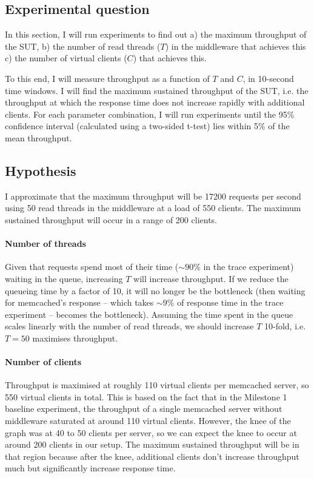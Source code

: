 \documentclass[11pt]{article}
\begin{document}
\subsection{Experimental question}

In this section, I will run experiments to find out a) the maximum throughput of the SUT, b) the number of read threads ($T$) in the middleware that achieves this c) the number of virtual clients ($C$) that achieves this.

To this end, I will measure throughput as a function of $T$ and $C$, in 10-second time windows. I will find the maximum sustained throughput of the SUT, i.e. the throughput at which the response time does not increase rapidly with additional clients. For each parameter combination, I will run experiments until the 95\% confidence interval (calculated using a two-sided t-test) lies within 5\% of the mean throughput.

\subsection{Hypothesis}

I approximate that the maximum throughput will be 17200 requests per second using 50 read threads in the middleware at a load of 550 clients. The maximum sustained throughput will occur in a range of 200 clients.

\paragraph{Number of threads} 
Given that requests spend most of their time ($\sim90\%$ in the trace experiment) waiting in the queue, increasing $T$ will increase throughput. If we reduce the queueing time by a factor of 10, it will no longer be the bottleneck (then waiting for memcached's response -- which takes $\sim9\%$ of response time in the trace experiment -- becomes the bottleneck). Assuming the time spent in the queue scales linearly with the number of read threads, we should increase $T$ 10-fold, i.e. $T=50$ maximises throughput.

\paragraph{Number of clients}
Throughput is maximised at roughly 110 virtual clients per memcached server, so 550 virtual clients in total. This is based on the fact that in the Milestone 1 baseline experiment, the throughput of a single memcached server without middleware saturated at around 110 virtual clients. However, the knee of the graph was at 40 to 50 clients per server, so we can expect the knee to occur at around 200 clients in our setup. The maximum sustained throughput will be in that region because after the knee, additional clients don't increase throughput much but significantly increase response time.
\end{document}
